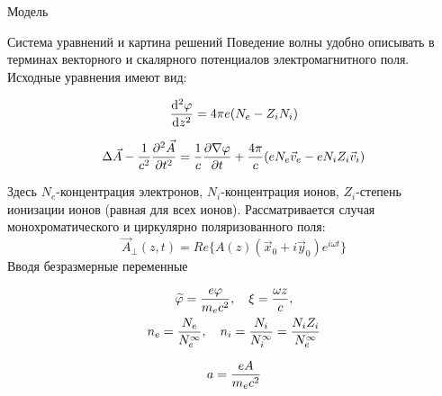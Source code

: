 \begin{frame}[t]{}
\begin{columns}[t]
\begin{column}{.48\linewidth}
\begin{block}{Модель}
        \end{block}

        \begin{block}{Система уравнений и картина решений}
            Поведение волны удобно описывать в терминах векторного и скалярного потенциалов электромагнитного поля. 
            Исходные уравнения имеют вид:

$$\dv[2]{\varphi}{z}=4\pi e(N_e-Z_iN_i)$$

$$\Delta \vec A-{{1}\over{c^2}}\pdv [2]{\vec A}{t}={{1}\over{c}}\pdv{\nabla \varphi}{t}+{{4\pi}\over{c}}(eN_e \vec v_e-eN_iZ_i\vec v_i)$$

\vspace{1.2em}

Здесь $N_e$-концентрация электронов, $N_i$-концентрация ионов, $Z_i$-степень ионизации ионов (равная для всех ионов).
Рассматривается случая монохроматического и циркулярно поляризованного поля:
\vspace{1.2em}
$$\vec A_\perp(z,t)=Re\{A(z)(\vec x_0+i\vec y_0)e^{i\omega t}\}$$
Вводя безразмерные переменные 

\begin{gather}
  \widetilde\varphi={{e\varphi}\over{m_ec^2}}, \quad
  \xi={{\omega z}\over{c}}, \\
  n_e={{N_e}\over{N_e^{\infty}}}, \quad
  n_i={{N_i}\over{N_i^{\infty}}}={{N_iZ_i}\over{N_e^{\infty}}}
\end{gather}

$$a={{eA}\over{m_ec^2}}$$


\vspace{1.2em}


\end{block}
\end{column}
\end{columns}
\end{frame}
